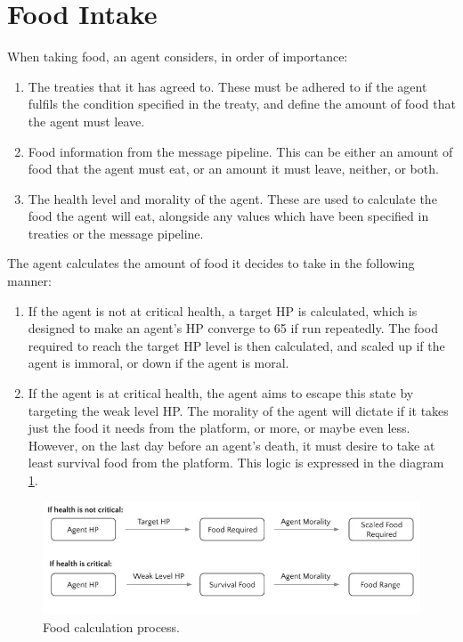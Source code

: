 \section{Food Intake}\label{sec:food_intake}
When taking food, an agent considers, in order of importance:
\begin{enumerate}
    \item The treaties that it has agreed to. These must be adhered to if the agent fulfils the condition specified in the treaty, and define the amount of food that the agent must leave. 
    \item Food information from the message pipeline. This can be either an amount of food that the agent must eat, or an amount it must leave, neither, or both.
    \item The health level and morality of the agent. These are used to calculate the food the agent will eat, alongside any values which have been specified in treaties or the message pipeline.
\end{enumerate}
The agent calculates the amount of food it decides to take in the following manner: 
\begin{enumerate}
    \item If the agent is not at critical health, a target HP is calculated, which is designed to make an agent's HP converge to 65 if run repeatedly. The food required to reach the target HP level is then calculated, and scaled up if the agent is immoral, or down if the agent is moral.
    \item If the agent is at critical health, the agent aims to escape this state by targeting the weak level HP. The morality of the agent will dictate if it takes just the food it needs from the platform, or more, or maybe even less. However, on the last day before an agent’s death, it must desire to take at least survival food from the platform. This logic is expressed in the diagram \ref{fig:food-diagram}.
\end{enumerate}
\begin{figure}[htb]
    \centering
    \includegraphics[width=0.5\linewidth]{005_team_3_agent_design/images/diagram1.jpg}
    \caption{Food calculation process.}
    \label{fig:food-diagram}
\end{figure}
